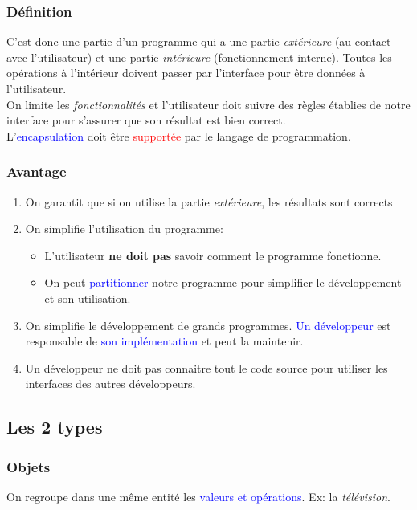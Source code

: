 \documentclass{report}
\begin{document}
\subsubsection{Définition}
C'est donc une partie d'un programme qui a une partie \textit{extérieure} (au contact avec l'utilisateur) et une partie \textit{intérieure} (fonctionnement interne). Toutes les opérations à l'intérieur doivent passer par l'interface pour être données à l'utilisateur.\\
On limite les \textit{fonctionnalités} et l'utilisateur doit suivre des règles établies de notre interface pour s'assurer que son résultat est bien correct.\\
L'\textcolor{blue}{encapsulation} doit être \textcolor{red}{supportée} par le langage de programmation.

\subsubsection{Avantage}
\begin{enumerate}
\item On garantit que si on utilise la partie \textit{extérieure}, les résultats sont corrects
\item On simplifie l'utilisation du programme:
	\begin{itemize}
	\item L'utilisateur \textbf{ne doit pas} savoir comment le programme fonctionne.
	\item On peut \textcolor{blue}{partitionner} notre programme pour simplifier le développement et son utilisation.
	\end{itemize}
\item On simplifie le développement de grands programmes. \textcolor{blue}{Un développeur} est responsable de \textcolor{blue}{son implémentation} et peut la maintenir.
\item Un développeur ne doit pas connaitre tout le code source pour utiliser les interfaces des autres développeurs.
\end{enumerate}

\subsection{Les 2 types}

\subsubsection{Objets}
On regroupe dans une même entité les \textcolor{blue}{valeurs et opérations}. Ex: la \textit{télévision}.
\end{document}
